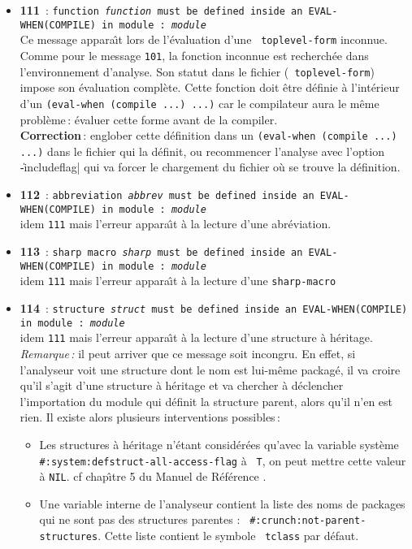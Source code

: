 \begin{itemize}
\item {\Large {\bf 111}}\ : {\tt function {\em function} must be defined inside
an EVAL-WHEN(COMPILE) in module : {\em module}}\\
Ce message appara\^{\i}t lors de l'\'{e}valuation d'une {\tt
toplevel-form} inconnue. Comme pour le message {\tt 101}, la fonction
inconnue est recherch\'{e}e dans l'environnement d'analyse.
Son statut dans le fichier ({\tt
toplevel-form}) impose son \'{e}valuation compl\`{e}te.
Cette fonction doit \^{e}tre d\'{e}finie \`{a} l'int\'{e}rieur d'un {\tt (eval-when
(compile ...) ...)} car le compilateur aura le m\^{e}me probl\`{e}me\,: \'{e}valuer
cette forme avant de la compiler. \\
{\bf Correction}\,: englober cette d\'{e}finition dans un {\tt (eval-when
(compile ...) ...)} dans le fichier qui la d\'{e}finit, ou recommencer
l'analyse avec l'option \|-includeflag| qui va forcer le chargement du
fichier o\`{u} se trouve la d\'{e}finition.

\item {\Large {\bf 112}}\ : {\tt abbreviation {\em abbrev} must be defined
inside an EVAL-WHEN(COMPILE) in module : {\em module}}\\
idem {\tt 111} mais l'erreur appara\^{\i}t \`{a} la lecture d'une
abr\'{e}viation.

\item {\Large {\bf 113}}\ : {\tt sharp macro {\em sharp} must be defined inside
an EVAL-WHEN(COMPILE) in module : {\em module}}\\
idem {\tt 111} mais l'erreur appara\^{\i}t \`{a} la lecture d'une
{\tt sharp-macro}

\item {\Large {\bf 114}}\ : {\tt structure {\em struct} must be defined inside
an EVAL-WHEN(COMPILE) in module : {\em module}}\\
idem {\tt 111} mais l'erreur appara\^{\i}t \`{a} la lecture d'une
structure \`{a} h\'{e}ritage.\\
{\em Remarque\,:} il peut arriver que ce message soit incongru. En
effet, si l'analyseur voit une structure dont le nom est lui-m\^{e}me
packag\'{e}, il va croire qu'il s'agit d'une structure \`{a} h\'{e}ritage et va
chercher \`{a} d\'{e}clencher l'importation du module qui d\'{e}finit la
structure parent, alors qu'il n'en est rien. Il existe alors plusieurs
interventions possibles\,:
\begin{itemize}
\item Les structures \`{a} h\'{e}ritage n'\'{e}tant consid\'{e}r\'{e}es qu'avec la
variable syst\`{e}me\\
{\tt \#:system:defstruct-all-access-flag} \`{a} {\tt
T}, on peut mettre cette valeur \`{a} {\tt NIL}. cf chap\^{\i}tre 5 du Manuel
de R\'{e}f\'{e}rence \LeLisp .
\item Une variable interne de l'analyseur contient la liste des noms
de packages qui ne sont pas des structures parentes : {\tt
\#:crunch:not-parent-structures}. Cette liste contient le symbole {\tt
tclass} par d\'{e}faut.
\end{itemize}


\end{itemize}
